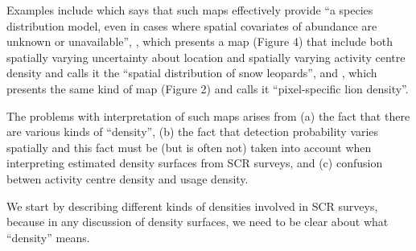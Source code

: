 \documentclass[10pt,a4paper]{article}
\begin{document}
Examples include \cite{Dorzaio+Karanth:17} which says that such maps effectively provide  ``a species distribution model, even in cases where spatial covariates of abundance are unknown or unavailable'', \cite{Alexander+al:15}, which presents a map (Figure 4) that include both spatially varying uncertainty about location and spatially varying activity centre density and calls it the ``spatial distribution of snow leopards'', and \cite{Elliot+Gopalaswamy:16}, which presents the same kind of map (Figure 2) and calls it ``pixel-specific lion density''. 

The problems with interpretation of such maps arises from (a) the fact that there are various kinds of ``density'', (b) the fact that detection probability varies spatially and this fact must be (but is often not) taken into account when interpreting estimated density surfaces from SCR surveys, and (c) confusion betwen activity centre density and usage density. 

We start by describing different kinds of densities involved in SCR surveys, because in any discussion of density surfaces, we need to be clear about what ``density'' means. %

\end{document}
